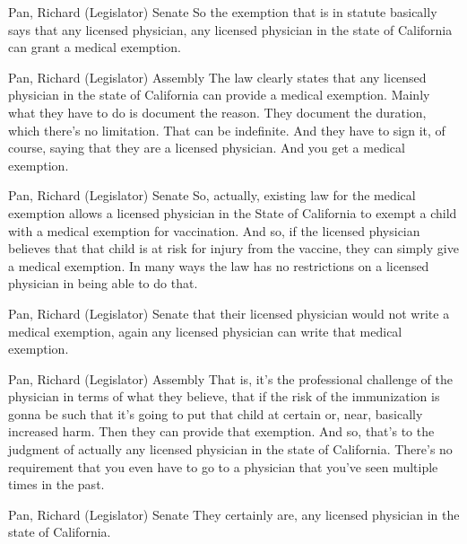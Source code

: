 \begin{result}{22.398952927698552}{Pan, Richard (Legislator) Senate}
So the exemption that is in statute basically says that any licensed physician, any licensed physician in the state of California can grant a medical exemption.
\end{result}

\begin{result}{21.591685490649436}{Pan, Richard (Legislator) Assembly}
The law clearly states that any licensed physician in the state of California can provide a medical exemption. Mainly what they have to do is document the reason. They document the duration, which there's no limitation. That can be indefinite. And they have to sign it, of course, saying that they are a licensed physician. And you get a medical exemption.
\end{result}

\begin{result}{19.281240261790572}{Pan, Richard (Legislator) Senate}
So, actually, existing law for the medical exemption allows a licensed physician in the State of California to exempt a child with a medical exemption for vaccination. And so, if the licensed physician believes that that child is at risk for injury from the vaccine, they can simply give a medical exemption. In many ways the law has no restrictions on a licensed physician in being able to do that.
\end{result}

\begin{result}{18.572197801528077}{Pan, Richard (Legislator) Senate}
that their licensed physician would not write a medical exemption, again any licensed physician can write that medical exemption.
\end{result}

\begin{result}{17.785507332229226}{Pan, Richard (Legislator) Assembly}
That is, it's the professional challenge of the physician in terms of what they believe, that if the risk of the immunization is gonna be such that it's going to put that child at certain or, near, basically increased harm. Then they can provide that exemption. And so, that's to the judgment of actually any licensed physician in the state of California. There's no requirement that you even have to go to a physician that you've seen multiple times in the past.
\end{result}

\begin{result}{15.941329185646078}{Pan, Richard (Legislator) Senate}
They certainly are, any licensed physician in the state of California.
\end{result}

